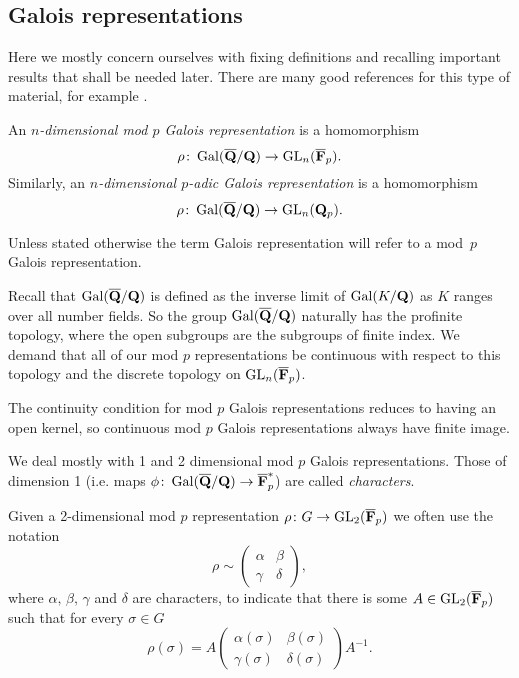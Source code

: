\documentclass[a4paper,12pt]{article}
\begin{document}
\subsection{Galois representations}\label{sec:gals}
Here we mostly concern ourselves with fixing definitions and recalling important results that shall be needed later.
There are many good references for this type of material, for example \cite{WieseGal}. %

\begin{defn}
An \emph{$n$-dimensional mod $p$ Galois representation} is a homomorphism
\[
\rho\colon \operatorname{Gal}(\overline{\mathbf{Q}}/\mathbf{Q}) \to \operatorname{GL}_n(\overline{\mathbf{F}}_p).
\]
Similarly, an \emph{$n$-dimensional $p$-adic Galois representation} is a homomorphism
\[
\rho\colon \operatorname{Gal}(\overline{\mathbf{Q}}/\mathbf{Q}) \to \operatorname{GL}_n(\mathbf{Q}_p).
\]

Unless stated otherwise the term Galois representation will refer to a mod~$p$ Galois representation.
\end{defn}

Recall that $\operatorname{Gal}(\overline{\mathbf{Q}}/\mathbf{Q})$ is defined as the inverse limit of $\operatorname{Gal}(K/\mathbf{Q})$ as $K$ ranges over all number fields.
So the group $\operatorname{Gal}(\overline{\mathbf{Q}}/\mathbf{Q})$ naturally has the profinite topology, where the open subgroups are the subgroups of finite index.
We demand that all of our mod $p$ representations be continuous with respect to this topology and the discrete topology on $\operatorname{GL}_n(\overline{\mathbf{F}}_p)$.

\begin{rmk}\label{rmk:ctsfin}
The continuity condition for mod $p$ Galois representations reduces to having an open kernel, so continuous mod $p$ Galois representations always have finite image.
\end{rmk}

We deal mostly with 1 and 2 dimensional mod $p$ Galois representations.
Those of dimension 1 (i.e. maps $\phi\colon\operatorname{Gal}(\overline{\mathbf{Q}}/\mathbf{Q}) \to \overline{\mathbf{F}}_p^*$) are called \emph{characters}.

Given a 2-dimensional mod $p$ representation $\rho\colon G\to \operatorname{GL}_2(\overline{\mathbf{F}}_p)$ we often use the notation
\[
\rho \sim \begin{pmatrix}
\alpha & \beta \\
\gamma & \delta
\end{pmatrix},
\]
where $\alpha,\,\beta,\,\gamma$ and $\delta$ are characters, to indicate that there is some $A\in\operatorname{GL}_2(\overline{\mathbf{F}}_p)$ such that for every $\sigma\in G$
\[
\rho(\sigma) = A
 \begin{pmatrix}
\alpha(\sigma) & \beta(\sigma) \\
\gamma(\sigma) & \delta(\sigma)
\end{pmatrix}A^{-1}.
\]
\end{document}
